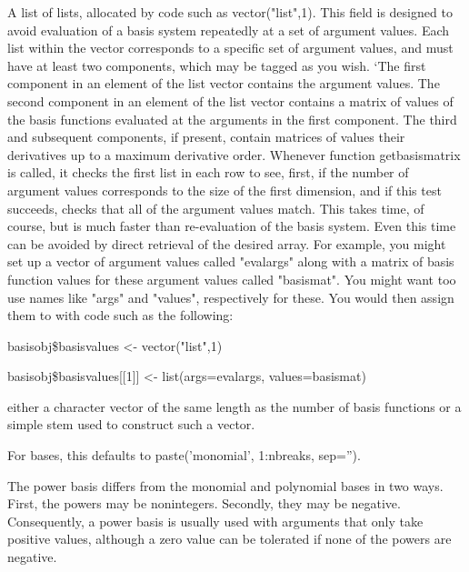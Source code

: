 \begin{Arguments}
\begin{ldescription}
\item[\code{basisvalues}] A list of lists, allocated by code such as vector("list",1).  This
field is designed to avoid evaluation of a basis system repeatedly
at a set of argument values.  Each list within the vector
corresponds to a specific set of argument values, and must have at
least two components, which may be tagged as you wish.  `The first
component in an element of the list vector contains the argument
values.  The second component in an element of the list vector
contains a matrix of values of the basis functions evaluated at the
arguments in the first component.  The third and subsequent
components, if present, contain matrices of values their derivatives
up to a maximum derivative order.  Whenever function getbasismatrix
is called, it checks the first list in each row to see, first, if
the number of argument values corresponds to the size of the first
dimension, and if this test succeeds, checks that all of the
argument values match.  This takes time, of course, but is much
faster than re-evaluation of the basis system.  Even this time can
be avoided by direct retrieval of the desired array.  For example,
you might set up a vector of argument values called "evalargs" along
with a matrix of basis function values for these argument values
called "basismat".  You might want too use names like "args" and
"values", respectively for these.  You would then assign them to
 with code such as the following:

basisobj\$basisvalues <- vector("list",1)

basisobj\$basisvalues[[1]] <- list(args=evalargs,
values=basismat)

\item[\code{names}] either a character vector of the same length as the number of basis
functions or a simple stem used to construct such a vector.

For  bases, this defaults to paste('monomial',
1:nbreaks, sep='').

\end{ldescription}
\end{Arguments}
\begin{Details}\relax
The power basis differs from the monomial and polynomial
bases in two ways.  First, the powers may be nonintegers.
Secondly, they may be negative.  Consequently, a power
basis is usually used with arguments that only take
positive values, although a zero value can be tolerated
if none of the powers are negative.
\end{Details}
